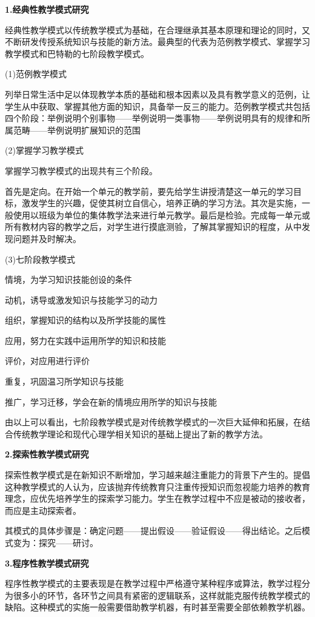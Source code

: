 \documentclass{article}
\begin{document}
\textbf{1.经典性教学模式研究}

经典性教学模式以传统教学模式为基础，在合理继承其基本原理和理论的同时，又不断研发传授系统知识与技能的新方法。最典型的代表为范例教学模式、掌握学习教学模式和巴特勒的七阶段教学模式。

(1)范例教学模式

列举日常生活中足以体现教学本质的基础和根本因素以及具有教学意义的范例，让学生从中获取、掌握其他方面的知识，具备举一反三的能力。范例教学模式共包括四个阶段：举例说明个别事物——举例说明一类事物——举例说明具有的规律和所属范畴——举例说明扩展知识的范围

(2)掌握学习教学模式

掌握学习教学模式的出现共有三个阶段。

首先是定向。在开始一个单元的教学前，要先给学生讲授清楚这一单元的学习目标，激发学生的兴趣，促使其树立自信心，培养正确的学习方法。其次是实施，一般使用以班级为单位的集体教学法来进行单元教学。最后是检验。完成每一单元或所有教材内容的教学之后，对学生进行摸底测验，了解其掌握知识的程度，从中发现问题并及时解决。

(3)七阶段教学模式

情境，为学习知识技能创设的条件

动机，诱导或激发知识与技能学习的动力

组织，掌握知识的结构以及所学技能的属性

应用，努力在实践中运用所学的知识和技能

评价，对应用进行评价

重复，巩固温习所学知识与技能

推广，学习迁移，学会在新的情境应用所学的知识与技能

由以上可以看出，七阶段教学模式是对传统教学模式的一次巨大延伸和拓展，在结合传统教学理论和现代心理学相关知识的基础上提出了新的教学方法。


\textbf{2.探索性教学模式研究}

探索性教学模式是在新知识不断增加，学习越来越注重能力的背景下产生的。提倡这种教学模式的人认为，应该抛弃传统教育只注重传授知识而忽视能力培养的教育理念，应优先培养学生的探索学习能力。学生在教学过程中不应是被动的接收者，而应是主动探索者。

其模式的具体步骤是：确定问题——提出假设——验证假设——得出结论。之后模式变为：探究——研讨。

\textbf{3.程序性教学模式研究}

程序性教学模式的主要表现是在教学过程中严格遵守某种程序或算法，教学过程分为很多小的环节，各环节之间具有紧密的逻辑联系，这样就能克服传统教学模式的缺陷。这种模式的实施一般需要借助教学机器，有时甚至需要全部依赖教学机器。
\end{document}
